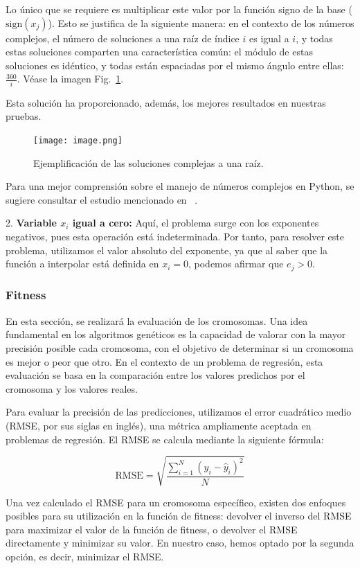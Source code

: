 \documentclass[conference,a4paper]{IEEEtran}
\def\figurename{Fig.}
\begin{document}
Lo único que se requiere es multiplicar este valor por la función signo de la base (\(\text{sign}(x_j)\)). Esto se justifica de la siguiente manera: en el contexto de los números complejos, el número de soluciones a una raíz de índice \(i\) es igual a \(i\), y todas estas soluciones comparten una característica común: el módulo de estas soluciones es idéntico, y todas están espaciadas por el mismo ángulo entre ellas: \(\frac{360}{i}\). Véase la imagen \figurename~\ref{fig:roots_example}.

Esta solución ha proporcionado, además, los mejores resultados en nuestras pruebas.


\begin{figure}[H]
    \centering
    \texttt{[image: image.png]}
    \caption{Ejemplificación de las soluciones complejas a una raíz.}
    \label{fig:roots_example}
\end{figure}

Para una mejor comprensión sobre el manejo de números complejos en Python, se sugiere consultar el estudio mencionado en ~\cite{b3}.

2. \textbf{Variable \( x_i \) igual a cero:} Aquí, el problema surge con los exponentes negativos, pues esta operación está indeterminada. Por tanto, para resolver este problema, utilizamos el valor absoluto del exponente, ya que al saber que la función a interpolar está definida en \( x_i = 0 \), podemos afirmar que \( e_j > 0 \).


\subsubsection{Fitness}
En esta sección, se realizará la evaluación de los cromosomas. Una idea fundamental en los algoritmos genéticos es la capacidad de valorar con la mayor precisión posible cada cromosoma, con el objetivo de determinar si un cromosoma es mejor o peor que otro. En el contexto de un problema de regresión, esta evaluación se basa en la comparación entre los valores predichos por el cromosoma y los valores reales.

Para evaluar la precisión de las predicciones, utilizamos el error cuadrático medio (RMSE, por sus siglas en inglés), una métrica ampliamente aceptada en problemas de regresión. El RMSE se calcula mediante la siguiente fórmula:

\[
\text{RMSE} = \sqrt{\frac{\sum_{i=1}^{N} (y_i - \hat{y}_i)^2}{N}}
\]


Una vez calculado el RMSE para un cromosoma específico, existen dos enfoques posibles para su utilización en la función de fitness: devolver el inverso del RMSE para maximizar el valor de la función de fitness, o devolver el RMSE directamente y minimizar su valor. En nuestro caso, hemos optado por la segunda opción, es decir, minimizar el RMSE.
\end{document}
